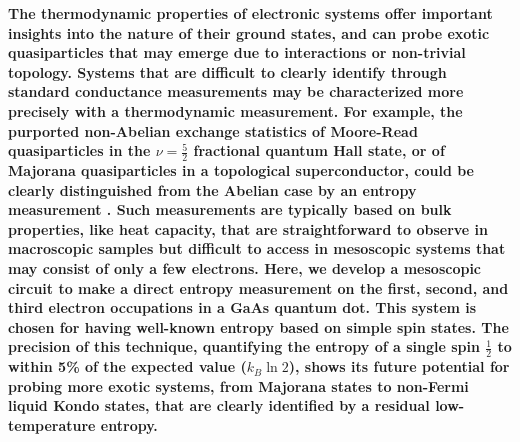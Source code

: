 \documentclass[twocolumn,showpacs,amsmath,amssymb,prl,aps,superscriptaddress]{revtex4-1}
\begin{document}
\textbf{The thermodynamic properties of electronic systems offer important insights into the nature of their ground states, and can probe exotic quasiparticles that may emerge due to interactions or non-trivial topology.  Systems that are difficult to clearly identify through standard conductance measurements may be characterized more precisely with a thermodynamic measurement. For example, the purported non-Abelian exchange statistics of Moore-Read quasiparticles in the $\nu = \frac{5}{2}$ fractional quantum Hall state, or of Majorana quasiparticles in a topological superconductor, could be clearly distinguished from the Abelian case by an entropy measurement \cite{Cooper2009, Smirnov2015}.  Such measurements are typically based on bulk properties, like heat capacity, that are straightforward to observe in macroscopic samples but difficult to access in mesoscopic systems that may consist of only a few electrons.  Here, we develop a mesoscopic circuit to make a direct entropy measurement on the first, second, and third electron occupations in a GaAs quantum dot.  This system is chosen for having well-known entropy based on simple spin states\cite{Tarucha1996, Ciorga2000, Duncan2000, Lindemann2002, Potok2003, Hofmann2016}.  The precision of this technique, quantifying the entropy of a single spin $\frac{1}{2}$ to within 5\% of the expected value ($k_B\ln{2}$), shows its future potential for probing more exotic systems, from Majorana states to non-Fermi liquid Kondo states, that are clearly identified by a residual low-temperature entropy\cite{Alkurtass2016}.}
\end{document}
